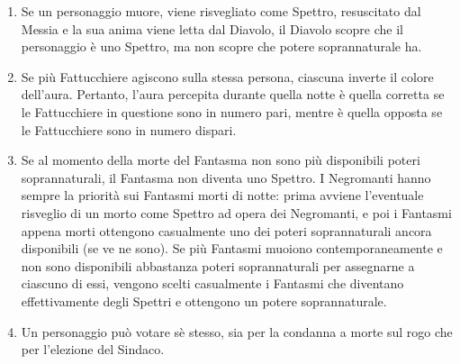 \documentclass[a4paper,10pt]{article}
\begin{document}
\begin{enumerate}
 \item Se un personaggio muore, viene risvegliato come Spettro, resuscitato dal Messia e la sua anima viene letta dal Diavolo, il Diavolo scopre che il personaggio è uno Spettro, ma non scopre che potere soprannaturale ha.
 
 \item Se più Fattucchiere agiscono sulla stessa persona, ciascuna inverte il colore dell'aura. Pertanto, l'aura percepita durante quella notte è quella corretta se le Fattucchiere in questione sono in numero pari, mentre è quella opposta se le Fattucchiere sono in numero dispari.
 
 \item Se al momento della morte del Fantasma non sono più disponibili poteri soprannaturali, il Fantasma non diventa uno Spettro.
 I Negromanti hanno sempre la priorità sui Fantasmi morti di notte: prima avviene l'eventuale risveglio di un morto come Spettro ad opera dei Negromanti, e poi i Fantasmi appena morti ottengono casualmente uno dei poteri soprannaturali ancora disponibili (se ve ne sono).
 Se più Fantasmi muoiono contemporaneamente e non sono disponibili abbastanza poteri soprannaturali per assegnarne a ciascuno di essi, vengono scelti casualmente i Fantasmi che diventano effettivamente degli Spettri e ottengono un potere soprannaturale.
 
 \item Un personaggio può votare sè stesso, sia per la condanna a morte sul rogo che per l'elezione del Sindaco.
\end{enumerate}

\printindex
\end{document}
